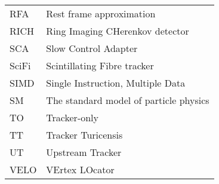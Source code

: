 \begin{supertabular}{ll}
    RFA     & Rest frame approximation \\
    RICH    & Ring Imaging CHerenkov detector \\
    SCA     & Slow Control Adapter \\
    SciFi   & Scintillating Fibre tracker \\
    SIMD    & Single Instruction, Multiple Data \\
    SM      & The standard model of particle physics \\
    TO      & Tracker-only \\
    TT      & Tracker Turicensis \\
    UT      & Upstream Tracker \\
    VELO    & VErtex LOcator \\
\end{supertabular}
